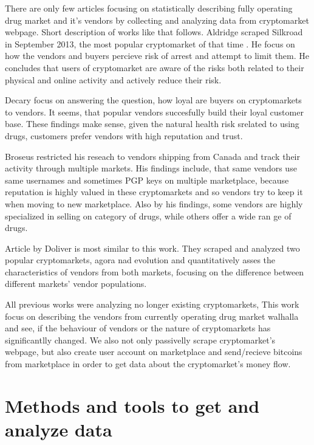 \documentclass[
  digital, %
  table,   %
  lof,     %
  lot,     %
  oneside
]{fithesis3}
\begin{document}
There are only few articles focusing on statistically describing fully operating drug market and it's vendors
by collecting and analyzing data from cryptomarket webpage. Short description of works like that follows.
Aldridge \parencite{aldridge2017delivery} scraped Silkroad in September 2013, the most popular cryptomarket of that time
.
He focus on how the vendors and buyers percieve risk of arrest and attempt to limit them.
He concludes that users of cryptomarket are aware of the risks both related to their physical and online activity
and actively reduce their risk.

Decary \parencite{decary2017repeat} focus on answering the question, how loyal are buyers 
on cryptomarkets to vendors. It seems, that popular vendors succesfully build their loyal
customer base. These findings make sense, given the natural health risk srelated to using drugs,
customers prefer vendors with high reputation and trust.

Broseus \parencite{broseus2016studying} restricted his reseach to vendors shipping from Canada
and track their activity through multiple markets. His findings include, that same vendors
use same usernames and sometimes PGP keys on multiple marketplace, because reputation
is highly valued in these cryptomarkets and so vendors try to keep it when moving to new marketplace.
Also by his findings, some vendors are highly specialized in selling on category of drugs, while others offer a wide ran
ge of drugs.

Article by Doliver \parencite{dolliver2016characteristics} is most similar to this work.
They scraped and analyzed two popular cryptomarkets, agora nad evolution and quantitatively asses
the characteristics of vendors from both markets, focusing on the difference
 between different markets' vendor populations.

 All previous works were analyzing no longer existing cryptomarkets,
 This work focus on describing the vendors from currently operating drug market walhalla 
 and see, if the behaviour of vendors or the nature of cryptomarkets
 has significantlly changed. We also not only passivelly scrape cryptomarket's webpage,
 but also create user account on marketplace and send/recieve bitcoins from marketplace
 in order to get data about the cryptomarket's money flow.
 

\chapter{Methods and tools to get and analyze data}
\end{document}

